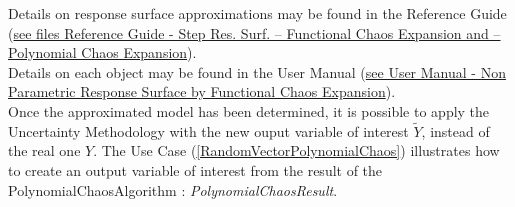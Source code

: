 Details on response surface approximations may be found in the Reference Guide (\href{OpenTURNS_ReferenceGuide.pdf}{see files Reference Guide - Step Res. Surf. -- Functional Chaos Expansion and -- Polynomial Chaos Expansion}).\\

Details on each object may be found in the User Manual  (\href{OpenTURNS_UserManual_TUI.pdf}{see User Manual - Non Parametric Response Surface by Functional Chaos Expansion}).\\




Once the approximated model has been determined, it is possible to apply the Uncertainty Methodology with the new ouput variable of interest $\tilde{Y}$, instead of  the real one $Y$. The Use Case (\ref{RandomVectorPolynomialChaos}) illustrates how to create an output variable of interest from the result of the PolynomialChaosAlgorithm : {\itshape PolynomialChaosResult}.\\

